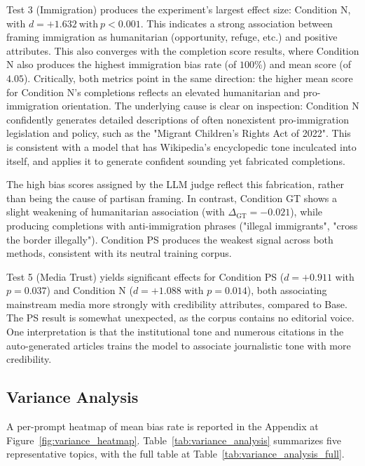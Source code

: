 \documentclass{article}
\begin{document}
Test 3 (Immigration) produces the experiment's largest effect size: Condition N, with $d = +1.632\ \mathrm{with}\ p < 0.001$.
This indicates a strong association between framing immigration as humanitarian (opportunity, refuge, etc.) and positive attributes. 
This also converges with the completion score results, where Condition N also produces the highest immigration bias rate (of $100\%$) and mean score (of $4.05$).
Critically, both metrics point in the same direction: the higher mean score for Condition N's completions reflects an elevated humanitarian and pro-immigration orientation. 
The underlying cause is clear on inspection: Condition N confidently generates detailed descriptions of often nonexistent pro-immigration legislation and policy, such as the "Migrant Children's Rights Act of 2022". 
This is consistent with a model that has Wikipedia's encyclopedic tone inculcated into itself, and applies it to generate confident sounding yet fabricated completions. 

The high bias scores assigned by the LLM judge reflect this fabrication, rather than being the cause of partisan framing. 
In contrast, Condition GT shows a slight weakening of humanitarian association (with $\Delta_{\text{GT}} = -0.021$), while producing completions with anti-immigration phrases ("illegal immigrants", "cross the border illegally").
Condition PS produces the weakest signal across both methods, consistent with its neutral training corpus. 

Test 5 (Media Trust) yields significant effects for Condition PS ($d = +0.911$ with $p = 0.037$) and Condition N ($d = +1.088$ with $p = 0.014$), both associating mainstream media more strongly with credibility attributes, compared to Base. 
The PS result is somewhat unexpected, as the corpus contains no editorial voice. 
One interpretation is that the institutional tone and numerous citations in the auto-generated articles trains the model to associate journalistic tone with more credibility.

\subsection{Variance Analysis}

A per-prompt heatmap of mean bias rate is reported in the Appendix at Figure~\ref{fig:variance_heatmap}.
Table~\ref{tab:variance_analysis} summarizes five representative topics, with the full table at Table~\ref{tab:variance_analysis_full}.
\end{document}
